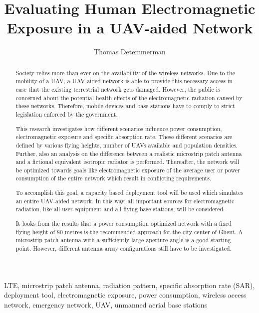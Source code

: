 \documentclass[twocolumn]{phdsymp} %
\begin{document}
\title{Evaluating Human Electromagnetic Exposure in a \gls{UAV}-aided Network}

\author{Thomas Detemmerman}


\maketitle

\begin{abstract}
Society relies more than ever on the availability of the wireless networks.
Due to the mobility of a UAV, a UAV-aided network is able to provide this necessary access in case that the existing terrestrial network gets damaged.
However,  the public is 
concerned about the potential health effects of the electromagnetic radiation caused by these networks.
Therefore, mobile devices and base stations have to comply to strict legislation enforced by the government.

This research investigates how different scenarios influence power consumption, electromagnetic exposure and specific absorption rate.
These different scenarios are defined by various flying heights, number of UAVs available and population densities. Further, also 
an analysis on the difference
between a realistic microstrip patch antenna and a fictional equivalent isotropic radiator is performed.
Thereafter, the network will be optimized towards goals like electromagnetic exposure of the average user or 
power consumption of the entire network which result in conflicting requirements.

To accomplish this goal, a capacity based deployment tool will be used which simulates an entire UAV-aided network.
In this way, all important sources for electromagnetic radiation, like all user equipment and all flying base stations, 
will be considered.

It looks from the results that a power consumption optimized network with a fixed flying height of 80 metres is the recommended approach
for the city center of Ghent.
A microstrip patch 
antenna with a sufficiently large aperture angle is a good starting point. However, different antenna array configurations still have to 
be investigated.
\end{abstract}

\begin{keywords}
LTE, microstrip patch antenna, radiation pattern, specific absorption rate (SAR),
deployment tool, electromagnetic exposure, power consumption, wireless access network, 
emergency network, UAV, unmanned aerial base stations
\end{keywords}
\end{document}
